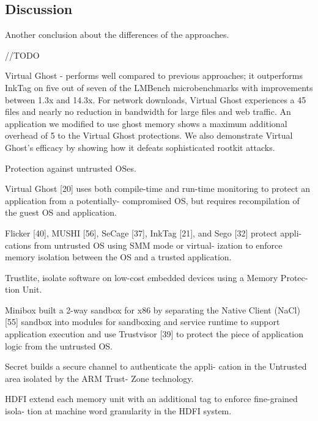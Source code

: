\subsection{Discussion}
\label{ssec:tee_frameworks_discussion}

Another conclusion about the differences of the approaches. 
 
//TODO

Virtual Ghost - 
performs well compared to previous approaches; it outperforms InkTag on five out of seven of the
LMBench microbenchmarks with improvements between
1.3x and 14.3x. For network downloads, Virtual Ghost experiences a 45%
files and nearly no reduction in bandwidth for large files
and web traffic. An application we modified to use ghost
memory shows a maximum additional overhead of 5%
to the Virtual Ghost protections. We also demonstrate Virtual Ghost’s efficacy by showing how it defeats sophisticated
rootkit attacks.

Protection against untrusted OSes.

Virtual Ghost [20] uses both compile-time and run-time
monitoring to protect an application from a potentially-
compromised OS, but requires recompilation of the
guest OS and application.

Flicker [40], MUSHI [56],
SeCage [37], InkTag [21], and Sego [32] protect appli-
cations from untrusted OS using SMM mode or virtual-
ization to enforce memory isolation between the OS and
a trusted application.

Trustlite, isolate software
on low-cost embedded devices using a Memory Protec-
tion Unit.

Minibox built a 2-way sandbox for x86
by separating the Native Client (NaCl) [55] sandbox into
modules for sandboxing and service runtime to support
application execution and use Trustvisor [39] to protect
the piece of application logic from the untrusted OS.

Secret builds a secure channel to authenticate the appli-
cation in the Untrusted area isolated by the ARM Trust-
Zone technology.

HDFI extend each memory
unit with an additional tag to enforce fine-grained isola-
tion at machine word granularity in the HDFI system.








